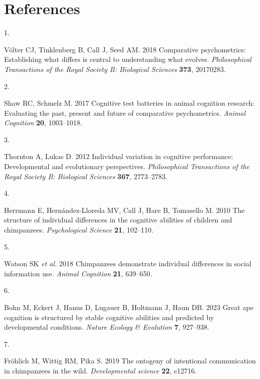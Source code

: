\documentclass[
  man,floatsintext]{apa6}
\newlength{\cslhangindent}
\newlength{\csllabelwidth}
\newenvironment{CSLReferences}[2] %
 {\begin{list}{}{%
  \setlength{\itemindent}{0pt}
  \setlength{\leftmargin}{0pt}
  \setlength{\parsep}{0pt}
  \ifodd #1
   \setlength{\leftmargin}{\cslhangindent}
   \setlength{\itemindent}{-1\cslhangindent}
  \fi
  \setlength{\itemsep}{#2\baselineskip}}}
 {\end{list}}
\newcommand{\CSLLeftMargin}[1]{\parbox[t]{\csllabelwidth}{\strut#1\strut}}
\newcommand{\CSLRightInline}[1]{\parbox[t]{\linewidth - \csllabelwidth}{\strut#1\strut}}
\begin{document}
\newpage

\section{References}\label{references}

\label{refs}
\begin{CSLReferences}{0}{1}
\CSLLeftMargin{1. }%
\CSLRightInline{Völter CJ, Tinklenberg B, Call J, Seed AM. 2018 Comparative psychometrics: Establishing what differs is central to understanding what evolves. \emph{Philosophical Transactions of the Royal Society B: Biological Sciences} \textbf{373}, 20170283.}

\CSLLeftMargin{2. }%
\CSLRightInline{Shaw RC, Schmelz M. 2017 Cognitive test batteries in animal cognition research: Evaluating the past, present and future of comparative psychometrics. \emph{Animal Cognition} \textbf{20}, 1003--1018.}

\CSLLeftMargin{3. }%
\CSLRightInline{Thornton A, Lukas D. 2012 Individual variation in cognitive performance: Developmental and evolutionary perspectives. \emph{Philosophical Transactions of the Royal Society B: Biological Sciences} \textbf{367}, 2773--2783.}

\CSLLeftMargin{4. }%
\CSLRightInline{Herrmann E, Hernández-Lloreda MV, Call J, Hare B, Tomasello M. 2010 The structure of individual differences in the cognitive abilities of children and chimpanzees. \emph{Psychological Science} \textbf{21}, 102--110.}

\CSLLeftMargin{5. }%
\CSLRightInline{Watson SK \emph{et al.} 2018 Chimpanzees demonstrate individual differences in social information use. \emph{Animal Cognition} \textbf{21}, 639--650.}

\CSLLeftMargin{6. }%
\CSLRightInline{Bohn M, Eckert J, Hanus D, Lugauer B, Holtmann J, Haun DB. 2023 Great ape cognition is structured by stable cognitive abilities and predicted by developmental conditions. \emph{Nature Ecology \& Evolution} \textbf{7}, 927--938.}

\CSLLeftMargin{7. }%
\CSLRightInline{Fröhlich M, Wittig RM, Pika S. 2019 The ontogeny of intentional communication in chimpanzees in the wild. \emph{Developmental science} \textbf{22}, e12716.}


\end{CSLReferences}
\end{document}
